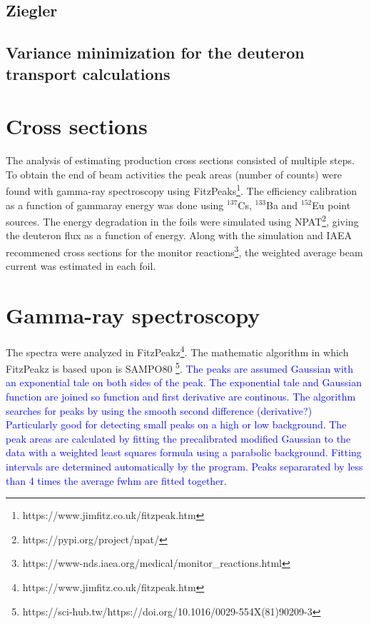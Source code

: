 \subsection{Ziegler}
\subsection{Variance minimization for the deuteron transport calculations}
\section{Cross sections}




The analysis of estimating production cross sections consisted of multiple steps. To obtain the end of beam activities the peak areas (number of counts) were found with gamma-ray spectroscopy using FitzPeaks\footnote{https://www.jimfitz.co.uk/fitzpeak.htm}. The efficiency calibration as a function of gammaray energy was done using $^{137}$Cs, $^{133}$Ba and $^{152}$Eu point sources. The energy degradation in the foils were simulated using NPAT\footnote{https://pypi.org/project/npat/}, giving the deuteron flux as a function of energy. Along with the simulation and IAEA recommened cross sections for the monitor reactions\footnote{https://www-nds.iaea.org/medical/monitor_reactions.html}, the weighted average beam current was estimated in each foil. 

\section{Gamma-ray spectroscopy}
The spectra were analyzed in FitzPeakz\footnote{https://www.jimfitz.co.uk/fitzpeak.htm}. The mathematic algorithm in which FitzPeakz is based upon is SAMPO80 \footnote{https://sci-hub.tw/https://doi.org/10.1016/0029-554X(81)90209-3}. \textcolor{blue}{The peaks are assumed Gaussian with an exponential tale on both sides of the peak. The exponential tale and Gaussian function are joined so function and first derivative are continous. The algorithm searches for peaks by using the smooth second difference (derivative?) Particularly good for detecting small peaks on a high or low background. The peak areas are calculated by fitting the precalibrated modified Gaussian to the data with a weighted least squares formula using a parabolic background. Fitting intervals are determined automatically by the program. Peaks separarated by less than 4 times the average fwhm are fitted together. }

